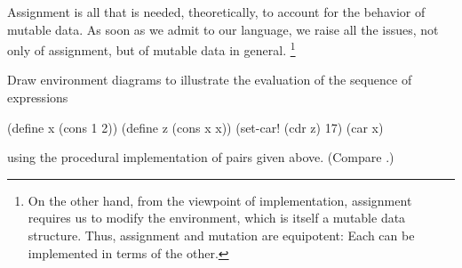 Assignment is all that is needed, theoretically, to account for the behavior of mutable data.
As soon as we admit  to our language, we raise all the issues, not only of assignment, but of mutable data in general.%
\footnote{
	On the other hand, from the viewpoint of implementation, assignment requires us to modify the environment, which is itself a mutable data structure.
	Thus, assignment and mutation are equipotent:
	Each can be implemented in terms of the other.
}



\begin{exercise}
	\label{Exercise 3.20}
	Draw environment diagrams to illustrate the evaluation of the sequence of expressions
	\begin{scheme}
	  (define x (cons 1 2))
	  (define z (cons x x))
	  (set-car! (cdr z) 17)
	  (car x)
	  ~~
	\end{scheme}
	using the procedural implementation of pairs given above.
	(Compare .)
\end{exercise}
